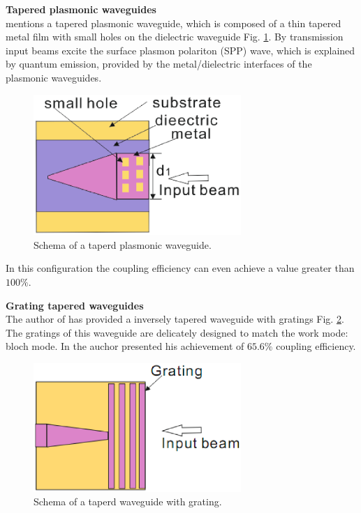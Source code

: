\textbf{Tapered plasmonic waveguides}\\
\cite{tapered_plasmonic_waveguides} mentions a tapered plasmonic waveguide, which is composed of a thin tapered metal film with small holes on the dielectric waveguide Fig. \ref{fig:tapered_waveguide_plasmonic}. By transmission input beams excite the surface plasmon polariton (SPP) wave, which is explained by quantum emission, provided by the metal/dielectric interfaces of the plasmonic waveguides.
\begin{figure}[!ht]
\centering
\includegraphics[width=0.7\textwidth]{bilder/tapered_waveguide_plasmonic}
\caption{Schema of a taperd plasmonic waveguide.}
\label{fig:tapered_waveguide_plasmonic}
\end{figure}
In this configuration the coupling efficiency can even achieve a value greater than $100\%$. 

\textbf{Grating tapered waveguides}\\
The author of \cite{fiber_to_chip_grating_waveguides} has provided a inversely tapered waveguide with gratings Fig. \ref{fig:tapered_waveguide_grating}. The gratings of this waveguide are  delicately designed to match the work mode: bloch mode. In \cite{fiber_to_chip_grating_waveguides} the auchor presented his achievement of $65.6\%$ coupling efficiency.  
\begin{figure}[!ht]
\centering
\includegraphics[width=0.7\textwidth]{bilder/tapered_waveguide_grating}
\caption{Schema of a taperd waveguide with grating.}
\label{fig:tapered_waveguide_grating}
\end{figure}
